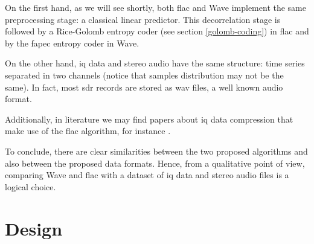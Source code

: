 On the first hand, as we will see shortly, both \acrshort{flac} and Wave implement the same preprocessing stage: a classical linear predictor. This decorrelation stage is followed by a Rice-Golomb entropy coder (see section \ref{golomb-coding}) in \acrshort{flac} and by the \acrshort{fapec} entropy coder in Wave.

On the other hand, \acrshort{iq} data and stereo audio have the same structure: time series separated in two channels (notice that samples distribution may not be the same). In fact, most \acrshort{sdr} records are stored as \acrshort{wav} files, a well known audio format.

Additionally, in literature we may find papers about \acrshort{iq} data compression that make use of the \acrshort{flac} algorithm, for instance \parencite{IQFlac}.

To conclude, there are clear similarities between the two proposed algorithms and also between the proposed data formats. Hence, from a qualitative point of view, comparing Wave and \acrshort{flac} with a dataset of \acrshort{iq} data and stereo audio files is a logical choice.

\section{Design}

